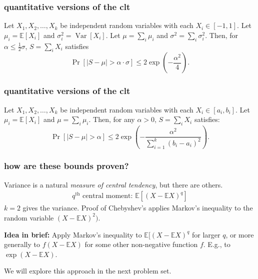 \documentclass[handout,compress]{beamer}
\newcommand{\E}{\mathbb{E}}
\DeclareMathOperator{\Var}{Var}
\begin{document}
\begin{frame}
	\frametitle{quantitative versions of the clt}
	\begin{theorem}
		Let $X_1, X_2, \ldots, X_k$ be independent random variables with each $X_i \in [-1,1]$.
		Let $\mu_i =\E[X_i]$ and $\sigma_i^2 = \Var[X_i]$. Let  $\mu =\sum_i \mu_i$ and $\sigma^2 =\sum_i \sigma_i^2$. Then, for $\alpha \leq \frac{1}{2}\sigma$, $S =\sum_i X_i$ satisfies
		$$\Pr[|S - \mu| > \alpha\cdot \sigma] \leq  2 \exp(-\frac{\alpha^2}{4}).$$
	\end{theorem}
\end{frame}

\begin{frame}
	\frametitle{quantitative versions of the clt}
	\begin{theorem}
		Let $X_1, X_2, \ldots, X_k$ be independent random variables with each $X_i \in [a_i,b_i]$.
		Let $\mu_i =\E[X_i]$ and $\mu =\sum_i \mu_i$. Then, for any $\alpha > 0$, $S =\sum_i X_i$ satisfies:
		$$\Pr[|S - \mu| > \alpha] \leq  2 \exp(-\frac{\alpha^2}{\sum_{i=1}^k (b_i-a_i)^2}).$$
	\end{theorem}
\end{frame}

\begin{frame}
	\frametitle{how are these bounds proven?}
	Variance is a natural \emph{measure of central tendency}, but there are others. 
	\begin{align*}
	q^\text{th} \text{ central moment: } \E[(X-\E X)^q]
	\end{align*}
$k = 2$ gives the variance. Proof of Chebyshev's applies Markov's inequality to the random variable $(X - \E X)^2)$.

\textbf{Idea in brief:} Apply Markov's inequality to $\E[(X-\E X)^q$ for larger $q$, or more generally to $f(X-\E X)$ for some other non-negative function $f$. E.g., to $\exp(X-\E X)$. 

We will explore this approach in the next problem set.
	
\end{frame}
\end{document}
